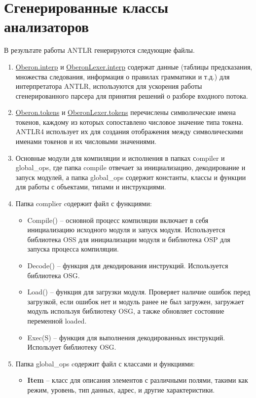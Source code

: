 \section{Сгенерированные классы анализаторов}
В результате работы ANTLR генерируются следующие файлы.
\begin{enumerate}
    \item \underline{Oberon.interp} и \underline{OberonLexer.interp} содержат данные (таблицы предсказания, множества следования, информация о правилах грамматики и т.д.) для интерпретатора ANTLR, используются для ускорения работы сгенерированного парсера для принятия решений о разборе входного потока.
    \item \underline{Oberon.tokens} и \underline{OberonLexer.tokens} перечислены символические имена токенов, каждому из которых сопоставлено числовое значение типа токена. ANTLR4 использует их для создания отображения между символическими именами токенов и их числовыми значениями.
    \item Основные модули для компиляции и исполнения в папках сompiler и global\_ops, где папка compile отвечает за инициализацию, декодирование и запуск модулей, а папка global\_ops содержит константы, классы и функции для работы с объектами, типами и инструкциями.   
    \item Папка complier cодержит файл с функциями:
    \begin{itemize}[label = ---]
        \item Compile() – основной процесс компиляции включает в себя инициализацию исходного модуля и запуск модуля. Используется библиотека OSS для инициализации модуля и библиотека OSP для запуска процесса компиляции.
        \item Decode() – функция для декодирования инструкций. Используется библиотека OSG.
        \item Load() – функция для загрузки модуля. Проверяет наличие ошибок перед загрузкой, если ошибок нет и модуль ранее не был загружен, загружает модуль используя библиотеку OSG, а также обновляет состояние переменной loaded.
        \item Exec(S) – функция для выполнения декодированных инструкций. Использует библиотеку OSG.
    \end{itemize}
    \item Папка global\_ops cодержит файл с классами и функциями:
    \begin{itemize}[label = ---]
        \item \textbf{Item} – класс для описания элементов с различными полями, такими как режим, уровень, тип данных, адрес, и другие характеристики.

\end{itemize}
\end{enumerate}
